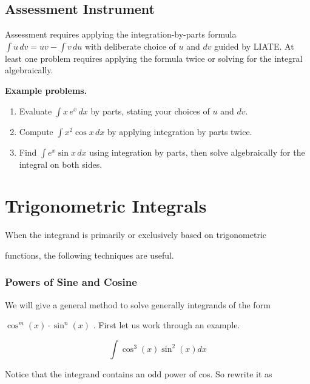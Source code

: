 \subsection{Assessment Instrument}
\label{ssec:inte-4b01}

Assessment requires applying the integration-by-parts formula $\int u\,dv = uv - \int v\,du$ with deliberate choice of $u$ and $dv$ guided by LIATE. At least one problem requires applying the formula twice or solving for the integral algebraically.

\textbf{Example problems.}

\begin{enumerate}
    \item Evaluate $\int x\,e^x\,dx$ by parts, stating your choices of $u$ and $dv$.
    \item Compute $\int x^2\cos x\,dx$ by applying integration by parts twice.
    \item Find $\int e^x\sin x\,dx$ using integration by parts, then solve algebraically for the integral on both sides.
\end{enumerate}

\section{Trigonometric Integrals}
\label{sec:trigonometric-integrals}

When the integrand is primarily or exclusively based on trigonometric

functions, the following techniques are useful.


\subsubsection{Powers of Sine and Cosine}
\label{sss:powe-2468}


We will give a general method to solve generally integrands of the form

$\cos^m(x)\cdot\sin^n(x)$ . First let us work through an example.


\[
\int\cos^3(x)\sin^2(x)dx
\]


Notice that the integrand contains an odd power of cos. So rewrite it as


